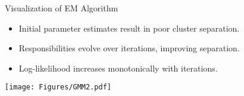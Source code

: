 \documentclass[11pt,handout,aspectratio=169]{beamer}
\begin{document}
\begin{frame}{Visualization of EM Algorithm}
\begin{itemize}
    \item Initial parameter estimates result in poor cluster separation.
    \item Responsibilities evolve over iterations, improving separation.
    \item Log-likelihood increases monotonically with iterations.
\end{itemize}

\texttt{[image: Figures/GMM2.pdf]}
\end{frame}
\end{document}
